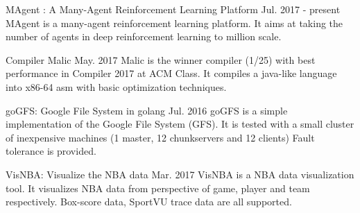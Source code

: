 

\begin{cventries}

  \cventry
    {} %
    {MAgent : A Many-Agent Reinforcement Learning Platform} %
    {Jul. 2017 - present} %
    {} %
    {
      MAgent is a many-agent reinforcement learning platform.
      It aims at taking the number of agents in deep reinforcement learning to
      million scale.
    }

  \cventry
    {} %
    {Compiler Malic} %
    {May. 2017} %
    {} %
    {
      Malic is the winner compiler (1/25) with best performance in Compiler 2017 at ACM Class.
      It compiles a java-like language into x86-64 asm with basic optimization techniques.
    }

  \cventry
    {} %
    {goGFS: Google File System in golang} %
    {Jul. 2016} %
    {} %
    {
        goGFS is a simple implementation of the Google File System (GFS).
        It is tested with a small cluster of inexpensive machines (1 master, 12 chunkservers and 12 clients)
        Fault tolerance is provided.
    }

  \cventry
    {} %
    {VisNBA: Visualize the NBA data} %
    {Mar. 2017} %
    {} %
    {
        VisNBA is a NBA data visualization tool. It visualizes NBA data from perspective of game, player and team respectively. Box-score data, SportVU trace data are all supported.
    }


\end{cventries}
